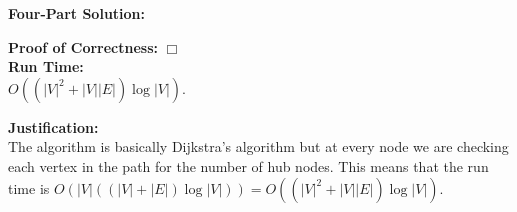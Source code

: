 \documentclass[11pt]{article}
\def\endproofmark{$\Box$}
\newenvironment{FourPartSolution}{\par{\bf Four-Part Solution:}}{\smallskip}
\newenvironment{proofOfCorrectness}{\par{\bf Proof of Correctness:}}{\endproofmark\smallskip}
\newenvironment{runTime}{{\bf Run Time:}}{\smallskip}
\newenvironment{justification}{\par{\bf Justification:}}{\smallskip}
\begin{document}
\begin{FourPartSolution}
\begin{proofOfCorrectness}
\end{proofOfCorrectness}
\\
\begin{runTime}
\\
$O((|V|^2 + |V||E|)\log{|V|})$.
\end{runTime}
\\
\begin{justification}
\\
The algorithm is basically Dijkstra's algorithm but at every node we are checking each vertex in the path for the number of hub nodes. This means that the run time is $O(|V|((|V| + |E|)\log{|V|})) = O((|V|^2 + |V||E|)\log{|V|})$.
\end{justification}
\end{FourPartSolution}



\newpage
\end{document}
